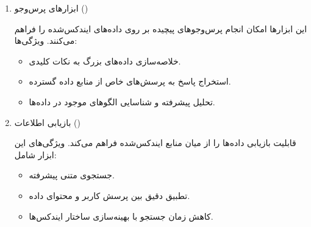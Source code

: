 \documentclass[11pt, a4paper, oneside]{book}
\begin{document}
\begin{enumerate}
\begin{itemize}
						\item {\large ایندکس‌های گرافی}: 
						برای نمایش و پردازش داده‌های متصل، مانند شبکه‌های اجتماعی یا روابط پیچیده بین داده‌ها.
						
						\item {\large ایندکس‌های ساده ()}:
						پردازش سریع داده‌ها با استفاده از کلیدواژه‌ها. 
						
					\end{itemize}
					
					این ایندکس‌ها به کاربران کمک می‌کنند اطلاعات دقیق‌تر و مرتبط‌تری از داده‌های بزرگ استخراج کنند.
					
					
					\item {\large ابزارهای پرس‌وجو ()} \par
					
					این ابزارها امکان انجام پرس‌وجوهای پیچیده بر روی داده‌های ایندکس‌شده را فراهم می‌کنند. ویژگی‌ها:
					
					\begin{itemize}
						
						\item خلاصه‌سازی داده‌های بزرگ به نکات کلیدی.
						
						\item استخراج پاسخ به پرسش‌های خاص از منابع داده گسترده.
						
						\item تحلیل پیشرفته و شناسایی الگوهای موجود در داده‌ها.
						
					\end{itemize}
					
					\item {\large بازیابی اطلاعات ()} \par
					
					قابلیت بازیابی داده‌ها را از میان منابع ایندکس‌شده فراهم می‌کند. ویژگی‌های این ابزار شامل:
					
					\begin{itemize}
						
						\item جستجوی متنی پیشرفته.
						
						\item تطبیق دقیق بین پرسش کاربر و محتوای داده.
						
						\item کاهش زمان جستجو با بهینه‌سازی ساختار ایندکس‌ها.
						
					\end{itemize}
					

\end{enumerate}
\end{document}
